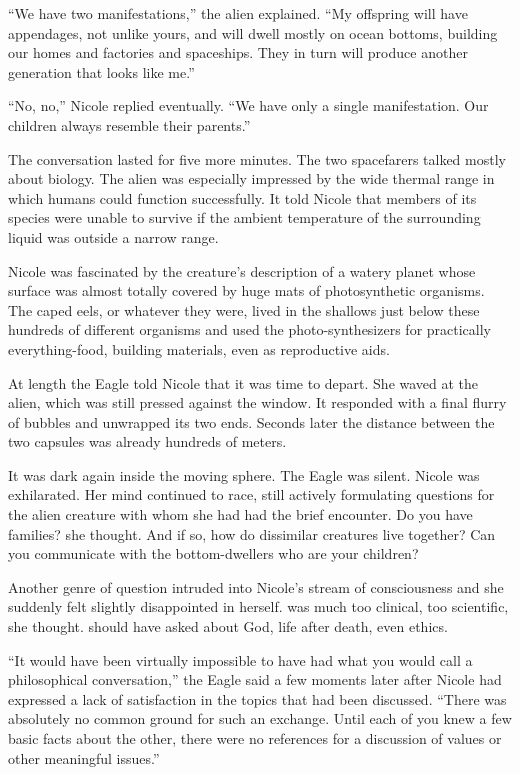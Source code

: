 \documentclass[]{article}
\begin{document}
{“We have two manifestations,” the alien explained.  “My offspring will have appendages, not unlike yours, and will dwell mostly on ocean bottoms, building our homes and factories and spaceships.  They in turn will produce another generation that looks like me.”

“No, no,” Nicole replied eventually.  “We have only a single manifestation.  Our children always resemble their parents.”

The conversation lasted for five more minutes.  The two spacefarers talked mostly about biology.  The alien was especially impressed by the wide thermal range in which humans could function successfully.  It told Nicole that members of its species were unable to survive if the ambient temperature of the surrounding liquid was outside a narrow range.

Nicole was fascinated by the creature’s description of a watery planet whose surface was almost totally covered by huge mats of photosynthetic organisms.  The caped eels, or whatever they were, lived in the shallows just below these hundreds of different organisms and used the photo-synthesizers for practically everything-food, building materials, even as reproductive aids.

At length the Eagle told Nicole that it was time to depart.  She waved at the alien, which was still pressed against the window.  It responded with a final flurry of bubbles and unwrapped its two ends.  Seconds later the distance between the two capsules was already hundreds of meters.

It was dark again inside the moving sphere.  The Eagle was silent.  Nicole was exhilarated.  Her mind continued to race, still actively formulating questions for the alien creature with whom she had had the brief encounter.  Do you have families? she thought.  And if so, how do dissimilar creatures live together? Can you communicate with the bottom-dwellers who are your children?

Another genre of question intruded into Nicole’s stream of consciousness and she suddenly felt slightly disappointed in herself.  was much too clinical, too scientific, she thought.  should have asked about God, life after death, even ethics.

“It would have been virtually impossible to have had what you would call a philosophical conversation,” the Eagle said a few moments later after Nicole had expressed a lack of satisfaction in the topics that had been discussed.  “There was absolutely no common ground for such an exchange.  Until each of you knew a few basic facts about the other, there were no references for a discussion of values or other meaningful issues.”

}
\end{document}
